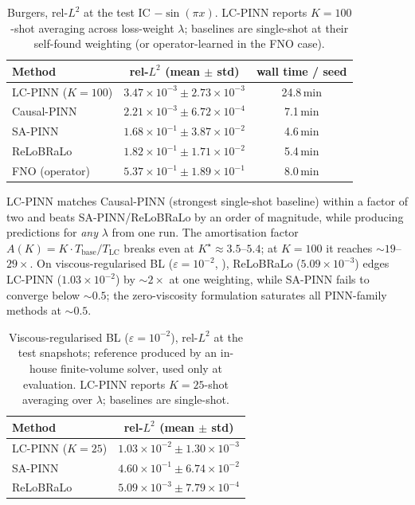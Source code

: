 \begin{table}[h]
\centering
\caption{Burgers, rel-$L^2$ at the test IC $-\sin(\pi x)$. LC-PINN
reports $K\!=\!100$-shot averaging across loss-weight $\lambda$;
baselines are single-shot at their self-found weighting (or
operator-learned in the FNO case).}
\label{tab:burgers}
\begin{tabular}{lcc}
\toprule
Method & rel-$L^2$ (mean $\pm$ std) & wall time / seed \\
\midrule
LC-PINN ($K\!=\!100$) & $3.47 \times 10^{-3} \pm 2.73 \times 10^{-3}$ & 24.8\,min \\
Causal-PINN           & $2.21 \times 10^{-3} \pm 6.72 \times 10^{-4}$ &  7.1\,min \\
SA-PINN               & $1.68 \times 10^{-1} \pm 3.87 \times 10^{-2}$ &  4.6\,min \\
ReLoBRaLo             & $1.82 \times 10^{-1} \pm 1.71 \times 10^{-2}$ &  5.4\,min \\
FNO (operator)        & $5.37 \times 10^{-1} \pm 1.89 \times 10^{-1}$ &  8.0\,min \\
\bottomrule
\end{tabular}
\end{table}

LC-PINN matches Causal-PINN (strongest single-shot baseline) within
a factor of two and beats SA-PINN/ReLoBRaLo by an order of
magnitude, while producing predictions for \emph{any} $\lambda$ from
one run. The amortisation factor
$A(K)\!=\!K \cdot T_{\mathrm{base}}/T_{\mathrm{LC}}$ breaks even at
$K^\star \!\approx\! 3.5$--$5.4$; at $K\!=\!100$ it reaches
$\sim\!19$--$29\times$.
On viscous-regularised BL ($\varepsilon \!=\! 10^{-2}$,
), ReLoBRaLo ($5.09\!\times\!10^{-3}$) edges LC-PINN
($1.03\!\times\!10^{-2}$) by $\sim\!2\times$ at one weighting, while
SA-PINN fails to converge below $\sim\!0.5$; the zero-viscosity
formulation saturates all PINN-family methods at $\sim\!0.5$.

\begin{table}[h]
\centering
\caption{Viscous-regularised BL ($\varepsilon\!=\!10^{-2}$),
rel-$L^2$ at the test snapshots; reference produced by an in-house
finite-volume solver, used only at evaluation. LC-PINN reports
$K\!=\!25$-shot averaging over $\lambda$; baselines are single-shot.}
\label{tab:bl}
\begin{tabular}{lc}
\toprule
Method & rel-$L^2$ (mean $\pm$ std) \\
\midrule
LC-PINN ($K\!=\!25$) & $1.03 \times 10^{-2} \pm 1.30 \times 10^{-3}$ \\
SA-PINN              & $4.60 \times 10^{-1} \pm 6.74 \times 10^{-2}$ \\
ReLoBRaLo            & $5.09 \times 10^{-3} \pm 7.79 \times 10^{-4}$ \\
\bottomrule
\end{tabular}
\end{table}

